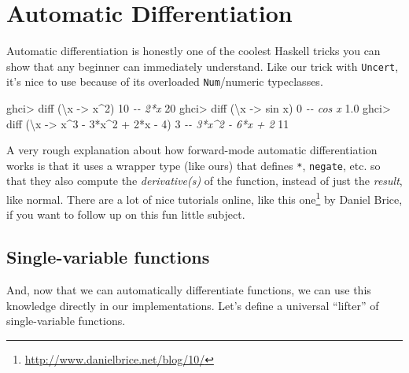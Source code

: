 \documentclass[]{article}
\newenvironment{Shaded}{}{}
\newcommand{\CommentTok}[1]{\textcolor[rgb]{0.38,0.63,0.69}{\textit{#1}}}
\newcommand{\DecValTok}[1]{\textcolor[rgb]{0.25,0.63,0.44}{#1}}
\newcommand{\FloatTok}[1]{\textcolor[rgb]{0.25,0.63,0.44}{#1}}
\newcommand{\FunctionTok}[1]{\textcolor[rgb]{0.02,0.16,0.49}{#1}}
\newcommand{\NormalTok}[1]{#1}
\newcommand{\OperatorTok}[1]{\textcolor[rgb]{0.40,0.40,0.40}{#1}}
\newcommand{\OtherTok}[1]{\textcolor[rgb]{0.00,0.44,0.13}{#1}}
\renewcommand{\href}[2]{#2\footnote{\url{#1}}}
\begin{document}
\section{Automatic Differentiation}\label{automatic-differentiation}

Automatic differentiation is honestly one of the coolest Haskell tricks you can
show that any beginner can immediately understand. Like our trick with
\texttt{Uncert}, it's nice to use because of its overloaded \texttt{Num}/numeric
typeclasses.

\begin{Shaded}
\begin{Highlighting}[]
\NormalTok{ghci}\OperatorTok{\textgreater{}}\NormalTok{ diff (\textbackslash{}x }\OtherTok{{-}\textgreater{}}\NormalTok{ x}\OperatorTok{\^{}}\DecValTok{2}\NormalTok{) }\DecValTok{10}       \CommentTok{{-}{-} 2*x}
\DecValTok{20}
\NormalTok{ghci}\OperatorTok{\textgreater{}}\NormalTok{ diff (\textbackslash{}x }\OtherTok{{-}\textgreater{}} \FunctionTok{sin}\NormalTok{ x) }\DecValTok{0}      \CommentTok{{-}{-} cos x}
\FloatTok{1.0}
\NormalTok{ghci}\OperatorTok{\textgreater{}}\NormalTok{ diff (\textbackslash{}x }\OtherTok{{-}\textgreater{}}\NormalTok{ x}\OperatorTok{\^{}}\DecValTok{3} \OperatorTok{{-}} \DecValTok{3}\OperatorTok{*}\NormalTok{x}\OperatorTok{\^{}}\DecValTok{2} \OperatorTok{+} \DecValTok{2}\OperatorTok{*}\NormalTok{x }\OperatorTok{{-}} \DecValTok{4}\NormalTok{) }\DecValTok{3}  \CommentTok{{-}{-} 3*x\^{}2 {-} 6*x + 2}
\DecValTok{11}
\end{Highlighting}
\end{Shaded}

A very rough explanation about how forward-mode automatic differentiation works
is that it uses a wrapper type (like ours) that defines \texttt{*},
\texttt{negate}, etc. so that they also compute the \emph{derivative(s)} of the
function, instead of just the \emph{result}, like normal. There are a lot of
nice tutorials online, like \href{http://www.danielbrice.net/blog/10/}{this one}
by Daniel Brice, if you want to follow up on this fun little subject.

\subsection{Single-variable functions}\label{single-variable-functions}

And, now that we can automatically differentiate functions, we can use this
knowledge directly in our implementations. Let's define a universal ``lifter''
of single-variable functions.
\end{document}
